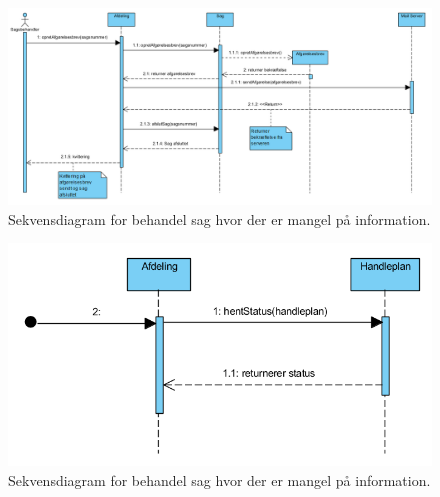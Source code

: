 \begin{figure}[hbt!]
  \includegraphics[width=\linewidth]{./PNG/sekDiaAfgoereSagsbehandAfgoerelse.PNG} 
  \caption{Sekvensdiagram for behandel sag hvor der er mangel på information.}
  \label{fig:ASAf}
\end{figure}
\newpage
\begin{figure}[hbt!]
  \includegraphics[width=\linewidth]{./PNG/sekDiaAfgoereSagsbehandFaerdig.PNG} 
  \caption{Sekvensdiagram for behandel sag hvor der er mangel på information.}
  \label{fig:ASFaer}
\end{figure}

